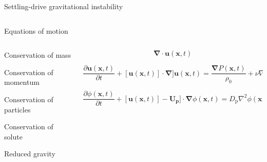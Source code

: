 \documentclass[final]{beamer} %
\begin{document}
\begin{frame}[t]
\begin{columns}[t]
\begin{column}{0.6\paperwidth}
\begin{block}{Settling-drive gravitational instability}
\begin{columns}[t]
\begin{column}{0.4\paperwidth}
          \end{column}
        \end{columns}
      \end{block}



      \begin{columns}[t]
        \begin{column}{0.43\paperwidth}

          \begin{block}{Equations of motion}

            \begin{columns}[t]

              \begin{column}{0.13\paperwidth}

                \centering

                Conservation of mass \\

                \vspace{1.75cm}

                Conservation of momentum \\

                \vspace{1.75cm}

                Conservation of particles \\

                \vspace{1.75cm}

                Conservation of solute \\

                \vspace{1.75cm}

                Reduced gravity 

              \end{column}

              \begin{column}{0.3\paperwidth}
                $$ \mathbf{\nabla} \cdot \mathbf{u}(\mathbf{x}, t) $$

                $$ \frac{\partial \mathbf{u}(\mathbf{x}, t)}{\partial t} +
                [\mathbf{u}(\mathbf{x}, t)] \cdot \mathbf{\nabla}]
                  \mathbf{u}(\mathbf{x}, t) =
                  \frac{\mathbf{\nabla} P(\mathbf{x}, t)}{\rho_{0}} +
                  \nu \nabla^{2} \mathbf{u}(\mathbf{x}, t) - g'\mathbf{\hat{z}} $$

                  $$ \frac{\partial \phi(\mathbf{x}, t)}{\partial t} +
                  [\mathbf{u}(\mathbf{x}, t)] - \mathbf{U_{\text{p}}}] \cdot
                    \mathbf{\nabla} \phi(\mathbf{x}, t) =
                    D_{\text{p}} \nabla^{2} \phi(\mathbf{x}, t) $$
                    

\end{column}
\end{columns}
\end{block}
\end{column}
\end{columns}
\end{column}
\end{columns}
\end{frame}
\end{document}
